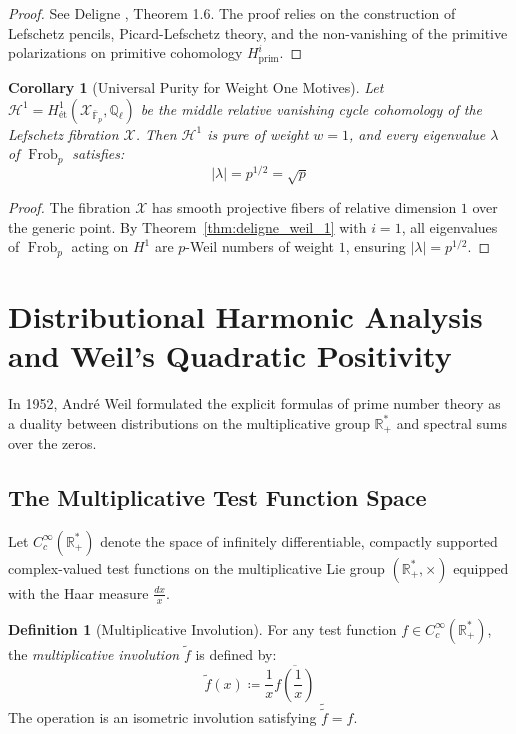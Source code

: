 \documentclass[11pt,a4paper]{article}
\newtheorem{corollary}[theorem]{Corollary}
\theoremstyle{definition}
\newtheorem{definition}[theorem]{Definition}
\begin{document}
\begin{proof}
See Deligne \cite{deligne1974}, Theorem 1.6. The proof relies on the construction of Lefschetz pencils, Picard-Lefschetz theory, and the non-vanishing of the primitive polarizations on primitive cohomology $H^i_{\text{prim}}$.
\end{proof}

\begin{corollary}[Universal Purity for Weight One Motives]\label{cor:weight_one_purity}
Let $\mathcal{H}^1 = H^1_{\text{ét}}(\mathcal{X}_{\bar{\mathbb{F}}_p}, \mathbb{Q}_\ell)$ be the middle relative vanishing cycle cohomology of the Lefschetz fibration $\mathcal{X}$. Then $\mathcal{H}^1$ is pure of weight $w = 1$, and every eigenvalue $\lambda$ of $\operatorname{Frob}_p$ satisfies:
\begin{equation}\label{eq:weight_one_bound}
|\lambda| = p^{1/2} = \sqrt{p}
\end{equation}
\end{corollary}

\begin{proof}
The fibration $\mathcal{X}$ has smooth projective fibers of relative dimension $1$ over the generic point. By Theorem~\ref{thm:deligne_weil_1} with $i = 1$, all eigenvalues of $\operatorname{Frob}_p$ acting on $H^1$ are $p$-Weil numbers of weight $1$, ensuring $|\lambda| = p^{1/2}$.
\end{proof}

\newpage

\section{Distributional Harmonic Analysis and Weil's Quadratic Positivity}
In 1952, André Weil \cite{weil1952, weil1972} formulated the explicit formulas of prime number theory as a duality between distributions on the multiplicative group $\mathbb{R}_+^*$ and spectral sums over the zeros.

\subsection{The Multiplicative Test Function Space}
Let $C_c^\infty(\mathbb{R}_+^*)$ denote the space of infinitely differentiable, compactly supported complex-valued test functions on the multiplicative Lie group $(\mathbb{R}_+^*, \times)$ equipped with the Haar measure $\frac{dx}{x}$.

\begin{definition}[Multiplicative Involution]\label{def:weil_involution}
For any test function $f \in C_c^\infty(\mathbb{R}_+^*)$, the \emph{multiplicative involution} $\tilde{f}$ is defined by:
\begin{equation}\label{eq:involution_exact}
\tilde{f}(x) \coloneqq \frac{1}{x} \overline{f\left( \frac{1}{x} \right)}
\end{equation}
The operation is an isometric involution satisfying $\widetilde{\tilde{f}} = f$.
\end{definition}
\end{document}
